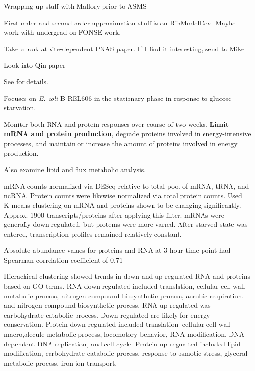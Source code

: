 \documentclass[11pt]{labbook}
\begin{document}

Wrapping up stuff with Mallory prior to ASMS

First-order and second-order approximation stuff is on RibModelDev. Maybe work with undergrad on FONSE work.

Take a look at site-dependent PNAS paper. If I find it interesting, send to Mike  

Look into Qin paper



See \cite{houser2015} for details.

Focuses on \textit{E. coli} B REL606 in the stationary phase in response to glucose starvation. 

Monitor both RNA and protein responses over course of two weeks. \textbf{Limit mRNA and protein production}, degrade proteins involved in energy-intensive processes, and maintain or increase the amount of proteins involved in energy production. 

Also examine lipid and flux metabolic analysis. 

mRNA counts normalized via DESeq relative to total pool of mRNA, tRNA, and ncRNA. Protein counts were likewise normalized via total protein counts. Used K-means clustering on mRNA and proteins shown to be changing significantly. Approx. 1900 transcripts/proteins after applying this filter. mRNAs were generally down-regulated, but proteins were more varied. After starved state was entered, transcription profiles remained relatively constant.  
 
Absolute abundance values for proteins and RNA at 3 hour time point had Spearman correlation coefficient of 0.71 

Hierachical clustering showed trends in down and up regulated RNA and proteins based on GO terms. RNA down-regulated included translation, cellular cell wall metabolic process, nitrogen compound biosynthetic process, aerobic respiration. and nitrogen compound biosynthetic process. RNA up-regulated was carbohydrate catabolic process. Down-regulated are likely for energy conservation. Protein down-regulated included translation, cellular cell wall macro,olecule metabolic process, locomotory behavior, RNA modification. DNA-dependent DNA replication, and cell cycle. Protein up-regualted included lipid modification, carbohydrate catabolic process, response to osmotic stress, glyceral metabolic process, iron ion transport.
\end{document}
